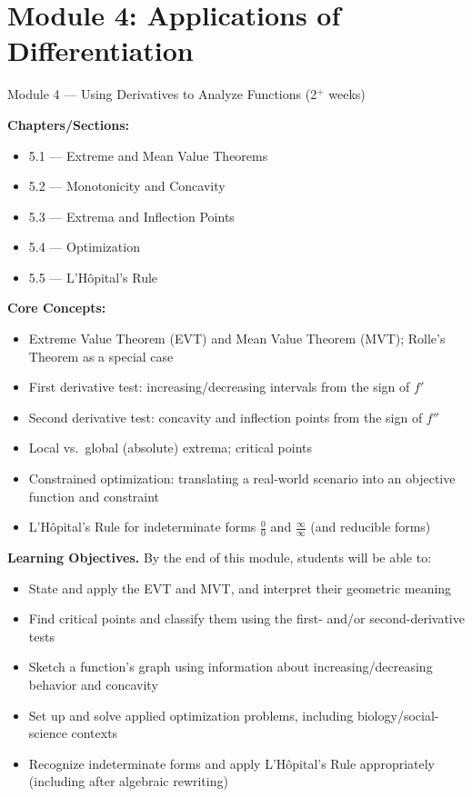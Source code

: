 \documentclass[11pt]{article}
\newcommand{\loheader}{\textbf{Learning Objectives.} By the end of this module, students will be able to:}
\begin{document}
\section{Module 4: Applications of Differentiation}
\label{mod:4}
\begin{modulebox}{Module 4 --- Using Derivatives to Analyze Functions \hfill (2$^+$ weeks)}

\textbf{Chapters/Sections:}
\begin{itemize}[nosep]
  \item 5.1 --- Extreme and Mean Value Theorems
  \item 5.2 --- Monotonicity and Concavity
  \item 5.3 --- Extrema and Inflection Points
  \item 5.4 --- Optimization
  \item 5.5 --- L'H\^{o}pital's Rule
\end{itemize}

\textbf{Core Concepts:}
\begin{itemize}[nosep]
  \item Extreme Value Theorem (EVT) and Mean Value Theorem (MVT); Rolle's Theorem as a special case
  \item First derivative test: increasing/decreasing intervals from the sign of $f'$
  \item Second derivative test: concavity and inflection points from the sign of $f''$
  \item Local vs.\ global (absolute) extrema; critical points
  \item Constrained optimization: translating a real-world scenario into an objective function and constraint
  \item L'H\^{o}pital's Rule for indeterminate forms $\frac{0}{0}$ and $\frac{\infty}{\infty}$ (and reducible forms)
\end{itemize}

\loheader
\begin{itemize}[nosep]
  \item State and apply the EVT and MVT, and interpret their geometric meaning
  \item Find critical points and classify them using the first- and/or second-derivative tests
  \item Sketch a function's graph using information about increasing/decreasing behavior and concavity
  \item Set up and solve applied optimization problems, including biology/social-science contexts
  \item Recognize indeterminate forms and apply L'H\^{o}pital's Rule appropriately (including after algebraic rewriting)
\end{itemize}
\end{modulebox}
\end{document}
